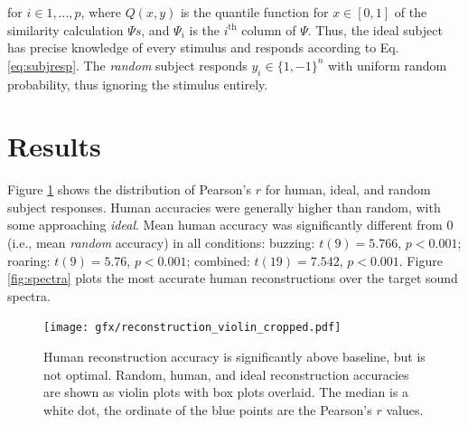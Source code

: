 \documentclass[journal]{IEEEtran}
\begin{document}
for $i \in 1, ..., p$, where $Q(x, y)$ is the quantile function for $x \in [0, 1]$ of the similarity calculation $\Psi s$, and
$\Psi_i$ is the $i^\mathrm{th}$ column of $\Psi$.
Thus, the ideal subject has precise knowledge of every stimulus and responds according to Eq. \ref{eq:subjresp}. The \textit{random} subject responds $y_i \in \{1,-1\}^n$ with uniform random probability, thus ignoring the stimulus entirely.

\section{Results}

Figure \ref{fig:reconstructions} shows the distribution of Pearson's $r$ for human, ideal, and random subject responses.
Human accuracies were generally higher than random,
with some approaching \textit{ideal}. 
Mean human accuracy was significantly different from $0$ (i.e., mean \textit{random} accuracy) in all conditions: buzzing: $t(9) = 5.766$, $p < 0.001$; roaring: $t(9) = 5.76$, $p < 0.001$; combined: $t(19) = 7.542$, $p < 0.001$.
Figure \ref{fig:spectra} plots the most accurate human reconstructions over the target sound spectra.

\begin{figure}[ht]
    \centering
    \texttt{[image: gfx/reconstruction\_violin\_cropped.pdf]}
    \caption{Human reconstruction accuracy is significantly above baseline,
    but is not optimal. Random, human, and ideal reconstruction accuracies
    are shown as violin plots with box plots overlaid.
    The median is a white dot, the ordinate of the blue points are the Pearson's $r$ values.}
    \label{fig:reconstructions}
\end{figure}
\end{document}
